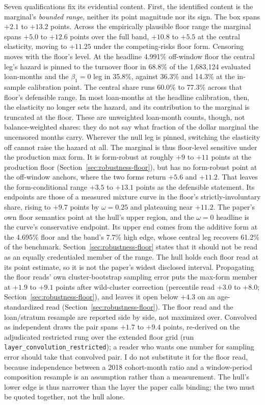 \documentclass[12pt]{article}
\begin{document}
Seven qualifications fix its evidential content. First, the identified content is the marginal's \emph{bounded range}, neither its point magnitude nor its sign. The box spans $+2.1$ to $+13.2$ points. Across the empirically plausible floor range the marginal spans $+5.0$ to $+12.6$ points over the full band, $+10.8$ to $+5.5$ at the central elasticity, moving to $+11.25$ under the competing-risks floor form. Censoring moves with the floor's level. At the headline 4.991\% off-window floor the central leg's hazard is pinned to the turnover floor in 68.8\% of the 1,683,124 evaluated loan-months and the $\beta_1 = 0$ leg in 35.8\%, against 36.3\% and 14.3\% at the in-sample calibration point. The central share runs 60.0\% to 77.3\% across that floor's defensible range. In most loan-months at the headline calibration, then, the elasticity no longer sets the hazard, and its contribution to the marginal is truncated at the floor. These are unweighted loan-month counts, though, not balance-weighted shares: they do not say what fraction of the dollar marginal the uncensored months carry. Wherever the null leg is pinned, switching the elasticity off cannot raise the hazard at all. The marginal is thus floor-level sensitive under the production max form. It is form-robust at roughly $+9$ to $+11$ points at the production floor (Section~\ref{sec:robustness-floor}), but has no form-robust point at the off-window anchors, where the two forms return $+5.6$ and $+11.2$. That leaves the form-conditional range $+3.5$ to $+13.1$ points as the defensible statement. Its endpoints are those of a measured mixture curve in the floor's strictly-involuntary share, rising to $+9.7$ points by $\omega = 0.25$ and plateauing near $+11.2$. The paper's own floor semantics point at the hull's upper region, and the $\omega = 0$ headline is the curve's conservative endpoint. Its upper end comes from the additive form at the 4.695\% floor and the band's 7.7\% high edge, whose central leg recovers 61.2\% of the benchmark. Section~\ref{sec:robustness-floor} states that it should not be read as an equally credentialed member of the range. The hull holds each floor read at its point estimate, so it is not the paper's widest disclosed interval. Propagating the floor reads' own cluster-bootstrap sampling error puts the max-form member at $+1.9$ to $+9.1$ points after wild-cluster correction (percentile read $+3.0$ to $+8.0$; Section~\ref{sec:robustness-floor}), and leaves it open below $+4.3$ on an age-standardized read (Section~\ref{sec:robustness-floor}). The floor read and the loan/stratum resample are reported side by side, not maximized over. Convolved as independent draws the pair spans $+1.7$ to $+9.4$ points, re-derived on the adjudicated restricted rung over the extended floor grid (run \texttt{layer\_convolution\_restricted}); a reader who wants one number for sampling error should take that convolved pair. I do not substitute it for the floor read, because independence between a 2018 cohort-month ratio and a window-period composition resample is an assumption rather than a measurement. The hull's lower edge is thus narrower than the layer the paper calls binding; the two must be quoted together, not the hull alone.
\end{document}
